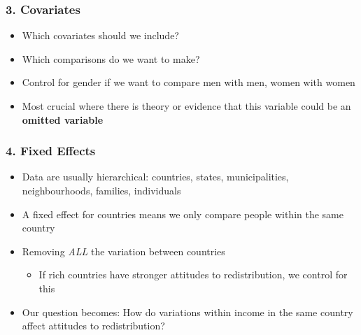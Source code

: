 \documentclass[xcolor=x11names,compress]{beamer}\usepackage[]{graphicx}\usepackage[]{color}
\renewcommand{\(}{\begin{columns}}
\renewcommand{\)}{\end{columns}}
\newcommand{\<}[1]{\begin{column}{#1}}
\renewcommand{\>}{\end{column}}
\begin{document}
\begin{frame}
\frametitle{3. Covariates}
\begin{itemize}
\item Which covariates should we include?
\pause
\item Which comparisons do we want to make?
\pause
\item Control for gender if we want to compare men with men, women with women
\pause
\item Most crucial where there is theory or evidence that this variable could be an \textbf{omitted variable}
\end{itemize}
\end{frame}

\begin{frame}
\frametitle{4. Fixed Effects}
\begin{itemize}
\item Data are usually hierarchical: countries, states, municipalities, neighbourhoods, families, individuals
\pause
\item A fixed effect for countries means we only compare people within the same country
\pause
\item Removing \textit{ALL} the variation between countries
\begin{itemize}
\item If rich countries have stronger attitudes to redistribution, we control for this
\end{itemize}
\pause
\item Our question becomes: How do variations within income in the same country affect attitudes to redistribution?
\end{itemize}
\end{frame}
\end{document}
